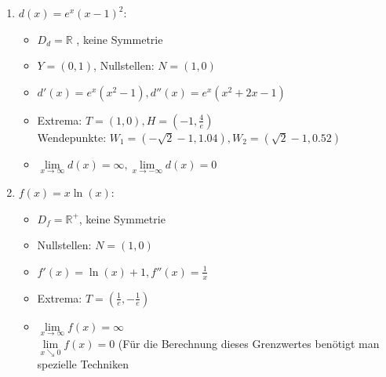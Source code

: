 \begin{enumerate}
\begin{enumerate}
\begin{itemize}
                        \item $c'(x) = \cos(x) - 2 \sin(x), c''(x) =  -\sin(x)-2\cos(x)$
                        \item Extrema: $T=(3.61+2k\pi, -2.24), H=(0.46+2k\pi, 2.24)$ \\
                              Wendepunkte: $W = (2.03 + k\pi, 0)$
                        \item $\lim\limits_{x \to \pm\infty} c(x) $ existiert nicht.
                    \end{itemize}
              \item \( d(x) = e^x(x - 1)^2 \):
                    \begin{itemize}
                        \item $D_d = \mathbb{R}$ , keine Symmetrie
                        \item $Y = (0, 1)$, Nullstellen: $N = (1,0)$
                        \item $d'(x) = e^x(x^2-1), d''(x) = e^x (x^2+2x-1)$
                        \item Extrema: $T=(1,0), H=(-1, \frac{4}{e})$ \\
                              Wendepunkte: $W_1 = (-\sqrt{2}-1, 1.04), W_2 =(\sqrt{2}-1, 0.52)$
                        \item $\lim\limits_{x \to \infty} d(x) = \infty, \lim\limits_{x \to -\infty} d(x) = 0$
                    \end{itemize}
              \item \( f(x) = x\ln(x) \):
                    \begin{itemize}
                        \item $D_f = \mathbb{R^+}$, keine Symmetrie
                        \item Nullstellen: $N = (1,0)$
                        \item $f'(x) = \ln(x) + 1, f''(x) = \frac{1}{x}$
                        \item Extrema: $T=\left(\frac{1}{e}, -\frac{1}{e}\right)$
                        \item $\lim\limits_{x \to \infty} f(x) = \infty$ \\
                              $\lim\limits_{x \searrow 0} f(x) = 0$ (Für die Berechnung dieses Grenzwertes benötigt man spezielle Techniken
                    \end{itemize}
          \end{enumerate}
\end{enumerate}

